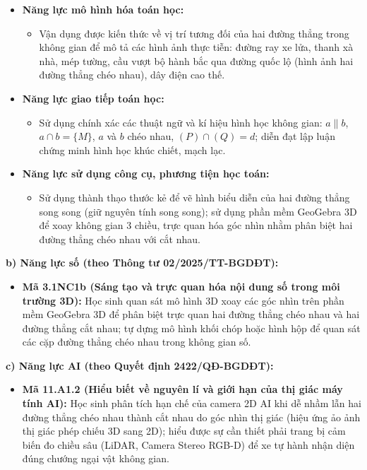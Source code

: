 \documentclass[12pt, a4paper]{article}
\begin{document}
\begin{itemize}[leftmargin=1.5em]
\begin{itemize}
    \end{itemize}
    \item \textbf{Năng lực mô hình hóa toán học:}
    \begin{itemize}
        \item Vận dụng được kiến thức về vị trí tương đối của hai đường thẳng trong không gian để mô tả các hình ảnh thực tiễn: đường ray xe lửa, thanh xà nhà, mép tường, cầu vượt bộ hành bắc qua đường quốc lộ (hình ảnh hai đường thẳng chéo nhau), dây điện cao thế.
    \end{itemize}
    \item \textbf{Năng lực giao tiếp toán học:}
    \begin{itemize}
        \item Sử dụng chính xác các thuật ngữ và kí hiệu hình học không gian: $a \parallel b$, $a \cap b = \{M\}$, $a$ và $b$ chéo nhau, $(P) \cap (Q) = d$; diễn đạt lập luận chứng minh hình học khúc chiết, mạch lạc.
    \end{itemize}
    \item \textbf{Năng lực sử dụng công cụ, phương tiện học toán:}
    \begin{itemize}
        \item Sử dụng thành thạo thước kẻ để vẽ hình biểu diễn của hai đường thẳng song song (giữ nguyên tính song song); sử dụng phần mềm GeoGebra 3D để xoay không gian 3 chiều, trực quan hóa góc nhìn nhằm phân biệt hai đường thẳng chéo nhau với cắt nhau.
    \end{itemize}
\end{itemize}

\textbf{b) Năng lực số (theo Thông tư 02/2025/TT-BGDĐT):}
\begin{itemize}[leftmargin=1.5em]
    \item \textbf{Mã 3.1NC1b (Sáng tạo và trực quan hóa nội dung số trong môi trường 3D):} Học sinh quan sát mô hình 3D xoay các góc nhìn trên phần mềm GeoGebra 3D để phân biệt trực quan hai đường thẳng chéo nhau và hai đường thẳng cắt nhau; tự dựng mô hình khối chóp hoặc hình hộp để quan sát các cặp đường thẳng chéo nhau trong không gian số.
\end{itemize}

\textbf{c) Năng lực AI (theo Quyết định 2422/QĐ-BGDĐT):}
\begin{itemize}[leftmargin=1.5em]
    \item \textbf{Mã 11.A1.2 (Hiểu biết về nguyên lí và giới hạn của thị giác máy tính AI):} Học sinh phân tích hạn chế của camera 2D AI khi dễ nhầm lẫn hai đường thẳng chéo nhau thành cắt nhau do góc nhìn thị giác (hiệu ứng ảo ảnh thị giác phép chiếu 3D sang 2D); hiểu được sự cần thiết phải trang bị cảm biến đo chiều sâu (LiDAR, Camera Stereo RGB-D) để xe tự hành nhận diện đúng chướng ngại vật không gian.
\end{itemize}
\end{document}
